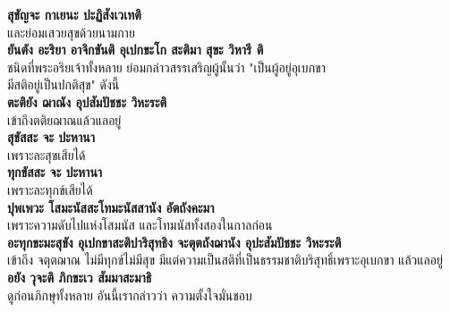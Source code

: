 \documentclass[12pt]{article}
\begin{document}
\textbf{สุขัญจะ กาเยนะ ปะฏิสังเวเทติ}\\
\indent และย่อมเสวยสุขด้วยนามกาย\\
\textbf{ยันตัง อะริยา อาจิกขันติ อุเปกขะโก สะติมา สุขะ วิหารี ติ}\\
\indent ชนิดที่พระอริยเจ้าทั้งหลาย ย่อมกล่าวสรรเสริญผู้นั้นว่า "เป็นผู้อยู่อุเบกขา\\
\indent มีสติอยู่เป็นปกติสุข" ดังนี้\\
\textbf{ตะติยัง ฌาณัง อุปสัมปัชชะ วิหะระติ}\\
\indent เข้าถึงตติยฌาณแล้วแลอยู่\\
\textbf{สุขัสสะ จะ ปะหานา}\\
\indent เพราะละสุขเสียได้\\
\textbf{ทุกขัสสะ จะ ปะหานา}\\
\indent เพราะละทุกข์เสียได้\\
\textbf{ปุพเพวะ โสมะนัสสะโทมะนัสสานัง อัตถังคะมา}\\
\indent เพราะความดับไปแห่งโสมนัส และโทมนัสทั้งสองในกาลก่อน\\
\textbf{อะทุกขะมะสุขัง อุเปกขาสะติปาริสุทธิง จะตุตถังฌานัง อุปะสัมปัชชะ วิหะระติ}\\
\indent เข้าถึง จตุตฌาณ ไม่มีทุกข์ไม่มีสุข มีแต่ความเป็นสติที่เป็นธรรมชาติบริสุทธิ์เพราะอุเบกขา แล้วแลอยู่\\
\textbf{อยัง วุจะติ ภิกขะเว สัมมาสะมาธิ}\\
\indent ดูก่อนภิกษุทั้งหลาย อันนี้เรากล่าวว่า ความตั้งใจมั่นชอบ\\

\pagebreak
\end{document}
